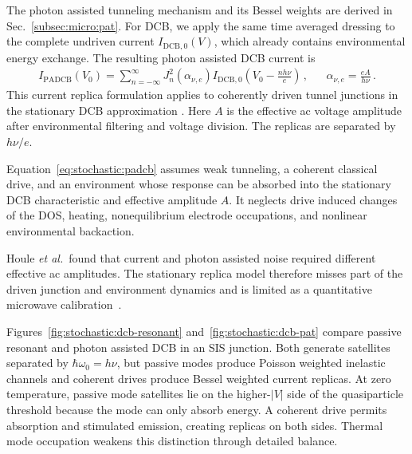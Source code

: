             The photon assisted tunneling mechanism and its Bessel weights are derived in Sec.~\ref{subsec:micro:pat}. For DCB, we apply the same time averaged dressing to the complete undriven current $I_{\mathrm{DCB},0}(V)$, which already contains environmental energy exchange. The resulting photon assisted DCB current is
            \begin{align}
                I_\mathrm{PADCB}(V_0) = \sum_{n=-\infty}^{\infty} J_n^2\!\left(\alpha_{\nu,e}\right) I_{\mathrm{DCB},0}\!\left(V_0 - \frac{nh\nu}{e}\right)\,, &&
                \alpha_{\nu,e} = \frac{eA}{h\nu}\,.
                \label{eq:stochastic:padcb}
            \end{align}
            This current replica formulation applies to coherently driven tunnel junctions in the stationary DCB approximation \cite{falci_quasiparticle_1991,grabert_dynamical_2015,parlavecchio_fluctuation_2015,houle_photon-assisted_2019}. Here $A$ is the effective ac voltage amplitude after environmental filtering and voltage division. The replicas are separated by $h\nu/e$.

            Equation~\eqref{eq:stochastic:padcb} assumes weak tunneling, a coherent classical drive, and an environment whose response can be absorbed into the stationary DCB characteristic and effective amplitude $A$. It neglects drive induced changes of the DOS, heating, nonequilibrium electrode occupations, and nonlinear environmental backaction.

            Houle \textit{et al.}~found that current and photon assisted noise required different effective ac amplitudes. The stationary replica model therefore misses part of the driven junction and environment dynamics and is limited as a quantitative microwave calibration~\cite{houle_photon-assisted_2019}.

            Figures~\ref{fig:stochastic:dcb-resonant} and~\ref{fig:stochastic:dcb-pat} compare passive resonant and photon assisted DCB in an SIS junction. Both generate satellites separated by $\hbar\omega_0=h\nu$, but passive modes produce Poisson weighted inelastic channels and coherent drives produce Bessel weighted current replicas. At zero temperature, passive mode satellites lie on the higher-$|V|$ side of the quasiparticle threshold because the mode can only absorb energy. A coherent drive permits absorption and stimulated emission, creating replicas on both sides. Thermal mode occupation weakens this distinction through detailed balance.

